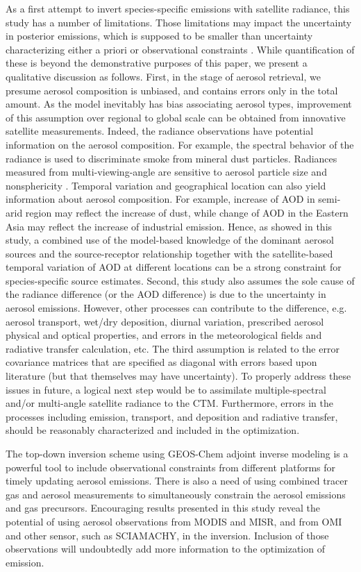  As a first attempt to invert species-specific emissions with satellite
radiance, this study has a number of limitations. Those limitations may
impact the uncertainty in posterior emissions, which is supposed to be
smaller than uncertainty characterizing either a priori or observational
constraints \citep{Rodgers00}. While quantification of these is beyond
the demonstrative purposes of this paper, we present a qualitative
discussion as follows. First, in the stage of aerosol retrieval, we
presume aerosol composition is unbiased, and contains errors only in the
total amount. As the model inevitably has bias associating aerosol
types, improvement of this assumption over regional to global scale can
be obtained from innovative satellite measurements. Indeed, the radiance 
observations have potential information on the aerosol composition.
For example, the spectral behavior of the radiance is used to
discriminate smoke from mineral dust particles\citep{King99, Kaufman02}.
Radiances measured from multi-viewing-angle are sensitive to aerosol 
particle size and nonsphericity \citep{Martonchik09}.
Temporal variation and geographical location can also yield information 
about aerosol composition. For example, increase of AOD in semi-arid
region may reflect the increase of dust, while change of AOD in the
Eastern Asia may reflect the increase of industrial emission.
Hence, as showed in this study, a combined use of the model-based
knowledge of the dominant aerosol sources and the source-receptor
relationship together with the satellite-based temporal variation of AOD
at different locations can be a strong constraint for species-specific
source estimates. Second, this study also assumes the sole cause of the
radiance difference (or the AOD difference) is due to the uncertainty in
aerosol emissions. However, other processes can contribute to the
difference, e.g. aerosol transport, wet/dry deposition, diurnal
variation, prescribed aerosol physical and optical properties, and
errors in the meteorological fields and radiative transfer calculation,
etc. The third assumption is related to the error covariance matrices
that are specified as diagonal with errors based upon literature (but
that themselves may have uncertainty). To properly address these issues
in future, a logical next step would be to assimilate multiple-spectral
and/or multi-angle satellite radiance to the CTM. Furthermore, errors in
the processes including emission, transport, and deposition and
radiative transfer, should be reasonably characterized and included in
the optimization. 

The top-down inversion scheme using GEOS-Chem adjoint inverse modeling
is a powerful tool to include observational constraints from different
platforms for timely updating aerosol emissions. There is also a need of
using combined tracer gas and aerosol measurements to simultaneously
constrain the aerosol emissions and gas precursors.
Encouraging results presented in this study reveal the potential of
using aerosol observations from MODIS and MISR,  and 
from OMI and other sensor, such as SCIAMACHY, in the inversion.
Inclusion of those observations will undoubtedly add more information to
the optimization of emission.


